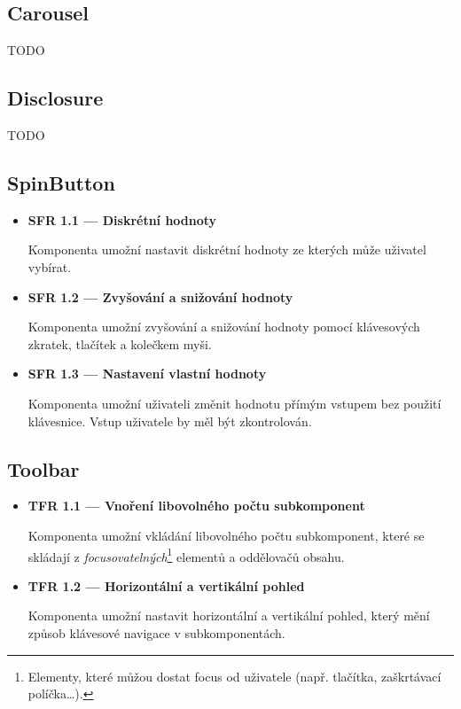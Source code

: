 \subsection{Carousel}

TODO

\subsection{Disclosure}

TODO

\subsection{SpinButton}

\begin{itemize}
      \item \textbf{SFR 1.1 --- Diskrétní hodnoty}

            Komponenta umožní nastavit diskrétní hodnoty ze kterých může uživatel vybírat.

      \item \textbf{SFR 1.2 --- Zvyšování a snižování hodnoty}

            Komponenta umožní zvyšování a snižování hodnoty pomocí klávesových zkratek, tlačítek a kolečkem myši.

      \item \textbf{SFR 1.3 --- Nastavení vlastní hodnoty}

            Komponenta umožní uživateli změnit hodnotu přímým vstupem bez použití klávesnice.
            Vstup uživatele by měl být zkontrolován.

\end{itemize}

\subsection{Toolbar}

\begin{itemize}
      \item \textbf{TFR 1.1 --- Vnoření libovolného počtu subkomponent}\label{tfr11}

            Komponenta umožní vkládání libovolného počtu subkomponent, které se skládají z \textit{focusovatelných}\footnote{Elementy, které můžou dostat focus od uživatele (např. tlačítka, zaškrtávací políčka\dots).} elementů a oddělovačů obsahu.

      \item \textbf{TFR 1.2 --- Horizontální a vertikální pohled}\label{tfr12}

            Komponenta umožní nastavit horizontální a vertikální pohled, který mění způsob klávesové navigace v subkomponentách.
\end{itemize}

